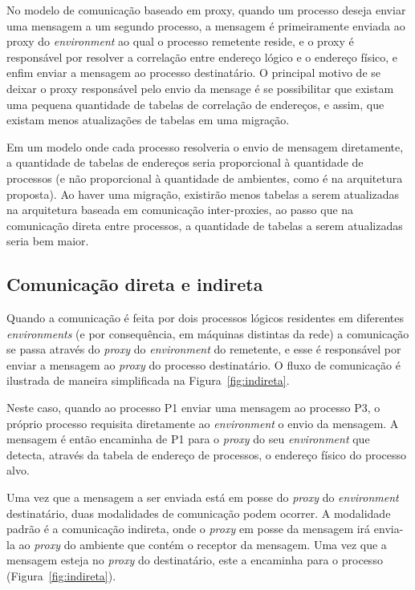 No modelo de comunicação baseado em proxy, quando um processo deseja enviar uma mensagem a um segundo processo, a mensagem é primeiramente enviada ao proxy do \textit{environment} ao qual o processo remetente reside, e o proxy é responsável por resolver a correlação entre endereço lógico e o endereço físico, e enfim enviar a mensagem ao processo destinatário. O principal motivo de se deixar o proxy responsável pelo envio da mensage é se possibilitar que existam uma pequena quantidade de tabelas de correlação de endereços, e assim, que existam menos atualizações de tabelas em uma migração.

Em um modelo onde cada processo resolveria o envio de mensagem diretamente, a quantidade de tabelas de endereços seria proporcional à quantidade de processos (e não proporcional à quantidade de ambientes, como é na arquitetura proposta). Ao haver uma migração, existirão menos tabelas a serem atualizadas na arquitetura baseada em comunicação inter-proxies, ao passo que na comunicação direta entre processos, a quantidade de tabelas a serem atualizadas seria bem maior.

\subsection{Comunicação direta e indireta}

Quando a comunicação é feita por dois processos lógicos residentes em diferentes \textit{environments} (e por consequência, em máquinas distintas da rede) a comunicação se passa através do \textit{proxy} do \textit{environment} do remetente, e esse é responsável por enviar a mensagem ao \textit{proxy} do processo destinatário. O fluxo de comunicação é ilustrada de maneira simplificada na Figura~\ref{fig:indireta}.

Neste caso, quando ao processo P1 enviar uma mensagem ao processo P3, o próprio processo requisita diretamente ao \textit{environment} o envio da mensagem. A mensagem é então encaminha de P1 para o \textit{proxy} do seu \textit{environment} que detecta, através da tabela de endereço de processos, o endereço físico do processo alvo. 

Uma vez que a mensagem a ser enviada está em posse do \textit{proxy} do \textit{environment} destinatário, duas modalidades de comunicação podem ocorrer. A modalidade padrão é a comunicação indireta, onde o \textit{proxy} em posse da mensagem irá envia-la ao \textit{proxy} do ambiente que contém o receptor da mensagem. Uma vez que a mensagem esteja no \textit{proxy} do destinatário, este a encaminha para o processo (Figura~\ref{fig:indireta}).

